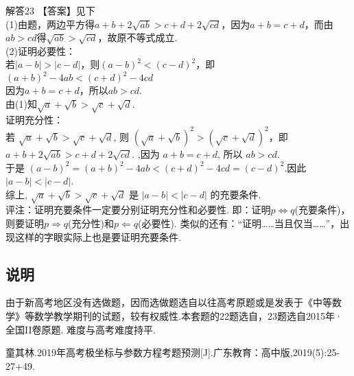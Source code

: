 \documentclass[11pt]{article}
\begin{document}
\heiti 解答23 \songti 【答案】见下
\\(1)由题，两边平方得$ a+b+2\sqrt{ab}>c+d+2\sqrt{cd}   $，因为$ a+b=c+d $，而由$ ab>cd $得$ \sqrt{ab}>\sqrt{cd} $，故原不等式成立.
\\(2)证明必要性：
\\ 若$ \left | a-b \right |>\left | c-d \right |   $，则$ (a-b)^2<(c-d)^2 $，即$ (a+b)^2-4ab<(c+d)^2-4cd $
\\因为$ a+b=c+d $，所以$ ab>cd$.
\\由(1)知$ \sqrt{a}+\sqrt{b}>\sqrt{c}+\sqrt{d} $.
\\证明充分性：
\\若 $\sqrt{a}+\sqrt{b}>\sqrt{c}+\sqrt{d}$, 则 $(\sqrt{a}+\sqrt{b})^2>(\sqrt{c}+\sqrt{d})^2$，即
$a+b+2 \sqrt{a b}>c+d+2 \sqrt{c d} \text {. }$,因为 $a+b=c+d$, 所以 $a b>c d$. 
\\于是
$(a-b)^{2}=(a+b)^{2}-4 a b<(c+d)^{2}-4 c d=(c-d)^{2} $.因此 $|a-b|<|c-d|$.
\\综上, $\sqrt{a}+\sqrt{b}>\sqrt{c}+\sqrt{d}$ 是 $|a-b|<|c-d|$ 的充要条件.
\\ \heiti 评注：\songti 证明充要条件一定要分别证明充分性和必要性. 即：证明$ p\Leftrightarrow q $(充要条件)，则要证明$ p\Rightarrow q $(充分性)和$ p\Leftarrow q $(必要性). 类似的还有：“证明……当且仅当……”，出现这样的字眼实际上也是要证明充要条件.
\subsection{\heiti 说明}
由于新高考地区没有选做题，因而选做题选自以往高考原题或是发表于《中等数学》等数学教学期刊的试题，较有权威性.本套题的22题选自\cite{ref1}，23题选自2015年·全国II卷原题. 难度与高考难度持平.
\begin{thebibliography}{1}
	 童其林.2019年高考极坐标与参数方程考题预测[J].广东教育：高中版,2019(5):25-27+49.
\end{thebibliography}
\end{document}
